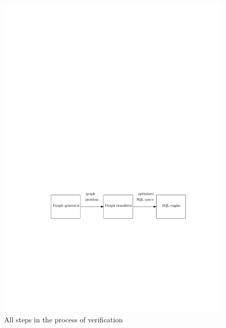 \begin{figure}
	\includegraphics{figures/process.pdf}
	\caption{All steps in the process of verification}
	\label{fig:process}
\end{figure}

